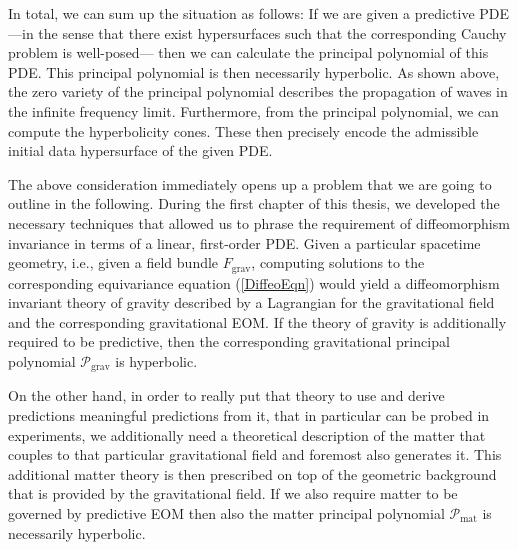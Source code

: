 In total, we can sum up the situation as follows: If we are given a predictive PDE ---in the sense that there exist hypersurfaces such that the corresponding Cauchy problem is well-posed--- then we can calculate the principal polynomial of this PDE. This principal polynomial is then necessarily hyperbolic. As shown above, the zero variety of the principal polynomial describes the propagation of waves in the infinite frequency limit. Furthermore, from the principal polynomial, we can compute the hyperbolicity cones. These then precisely encode the admissible initial data hypersurface of the given PDE.

The above consideration immediately opens up a problem that we are going to outline in the following. During the first chapter of this thesis, we developed the necessary techniques that allowed us to phrase the requirement of diffeomorphism invariance in terms of a linear, first-order PDE. Given a particular spacetime geometry, i.e., given a field bundle $F_{\text{grav}}$, computing solutions to the corresponding equivariance equation (\ref{DiffeoEqn}) would yield a diffeomorphism invariant theory of gravity described by a Lagrangian for the gravitational field and the corresponding gravitational EOM.
If the theory of gravity is additionally required to be predictive, then the corresponding gravitational principal polynomial $\mathcal{P}_{\text{grav}}$ is hyperbolic.

On the other hand, in order to really put that theory to use and derive predictions meaningful predictions from it, that in particular can be probed in experiments, we additionally need a theoretical description of the matter that couples to that particular gravitational field and foremost also generates it.
This additional matter theory is then prescribed on top of the geometric background that is provided by the gravitational field. If we also require matter to be governed by predictive EOM then also the matter principal polynomial $\mathcal{P}_{\text{mat}}$ is necessarily hyperbolic.

